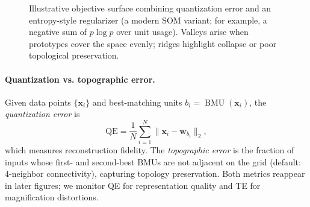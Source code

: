 \begin{figure}[t]
    \centering
    \caption{Illustrative objective surface combining quantization error and an entropy-style regularizer (a modern SOM variant; for example, a negative sum of \(p\log p\) over unit usage). Valleys arise when prototypes cover the space evenly; ridges highlight collapse or poor topological preservation.}
    \label{fig:lec5-crossentropy}
\end{figure}


\paragraph{Quantization vs. topographic error.} Given data points \(\{\mathbf{x}_i\}\) and best-matching units \(b_i = \operatorname{BMU}(\mathbf{x}_i)\), the \emph{quantization error} is
\[
    \text{QE} = \frac{1}{N}\sum_{i=1}^N \bigl\|\mathbf{x}_i - \mathbf{w}_{b_i}\bigr\|_2,
\]
which measures reconstruction fidelity. The \emph{topographic error} is the fraction of inputs whose first- and second-best BMUs are not adjacent on the grid (default: 4-neighbor connectivity), capturing topology preservation. Both metrics reappear in later figures; we monitor QE for representation quality and TE for magnification distortions.

